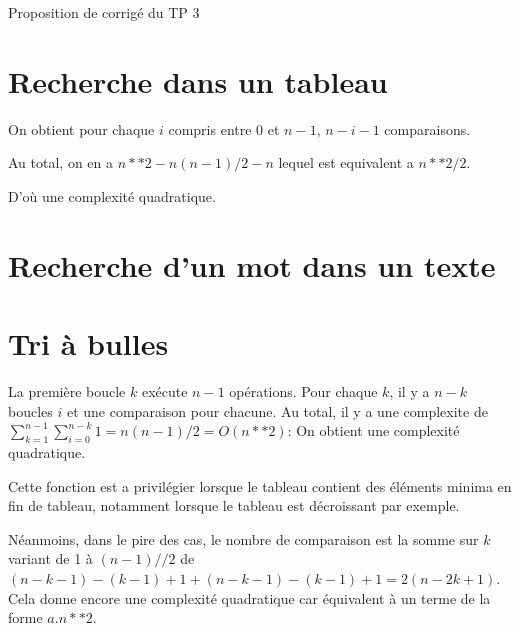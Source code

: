 
	
\begin{Large}
	Proposition de corrigé du TP 3
\end{Large}



\section*{Recherche dans un tableau}



On obtient pour chaque $i$ compris entre 0 et $n-1$, $n-i-1$ comparaisons.

Au total, on en a $n**2-n(n-1)/2-n$ lequel est equivalent a $n**2/2$.

D'où une complexité quadratique.


\eject

\section*{Recherche d'un mot dans un texte}



\eject \section*{Tri à bulles}



La première boucle $k$ ex\'ecute $n-1$ opérations. Pour chaque $k$, il y a $n-k$ boucles $i$ et une comparaison pour chacune. Au total, il y a une complexite de $\displaystyle\sum_{k=1}^{n-1}\sum_{i=0}^{n-k} 1 =n(n-1)/2 = O(n**2)$:
On obtient une complexité quadratique.



\eject 


Cette fonction est a privilégier lorsque le tableau contient des éléments minima en fin de tableau, notamment lorsque le tableau est décroissant par exemple.

Néanmoins, dans le pire des cas, le nombre de comparaison est la somme sur $k$ variant de 1 à $(n-1)//2$ de $(n-k-1)-(k-1)+1+(n-k-1)-(k-1)+1=2(n-2k+1)$. Cela donne encore une complexité quadratique car équivalent à un terme de la forme $a.n**2$.



